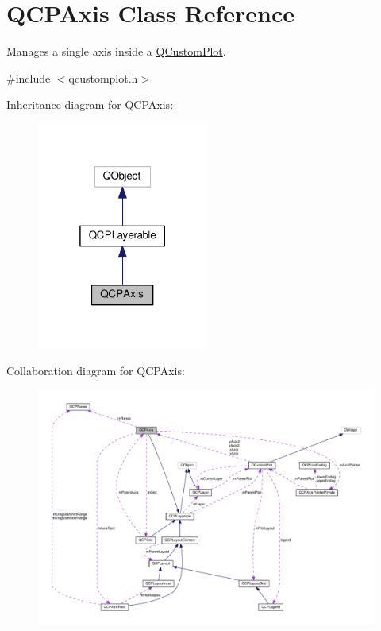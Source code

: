 \hypertarget{classQCPAxis}{}\section{Q\+C\+P\+Axis Class Reference}
\label{classQCPAxis}


Manages a single axis inside a \hyperlink{classQCustomPlot}{Q\+Custom\+Plot}.  




{\ttfamily \#include $<$qcustomplot.\+h$>$}



Inheritance diagram for Q\+C\+P\+Axis\+:\nopagebreak
\begin{figure}[H]
\begin{center}
\leavevmode
\includegraphics[width=160pt]{classQCPAxis__inherit__graph}
\end{center}
\end{figure}


Collaboration diagram for Q\+C\+P\+Axis\+:\nopagebreak
\begin{figure}[H]
\begin{center}
\leavevmode
\includegraphics[width=350pt]{classQCPAxis__coll__graph}
\end{center}
\end{figure}
